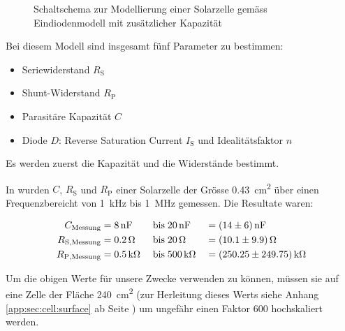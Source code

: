 \clearpage
\begin{figure}[h!tb]
    \centering
    
    \caption{%
        Schaltschema    zur    Modellierung    einer    Solarzelle    gem\"ass
        Eindiodenmodell mit zus\"atzlicher Kapazit\"at%
    }
    \label{fig:circuit:solarCell}
\end{figure}

Bei diesem Modell sind insgesamt f\"unf Parameter zu bestimmen:

\begin{itemize}
    \firmlist
    \item
        Seriewiderstand $R_{\mathrm{S}}$
    \item
        Shunt-Widerstand $R_{\mathrm{P}}$
    \item
        Parasit\"are Kapazit\"at $C$
    \item
        Diode   $D$: Reverse    Saturation   Current    $I_{\mathrm{S}}$   und
        Idealit\"atsfaktor $n$
\end{itemize}

Es werden zuerst die Kapazit\"at und die Widerst\"ande bestimmt.

In \cite{ref:solar:scofield} wurden $C$, $R_{\mathrm{S}}$ und $R_{\mathrm{P}}$
einer  Solarzelle der  Gr\"osse  \SI{0.43}{\centi\meter\squared} \"uber  einen
Frequenzbereicht von \SI{1}{\kilo\hertz} bis \SI{1}{\mega\hertz} gemessen. Die
Resultate waren:

\begin{alignat}{3}
    \label{eq:scofield:C}
    C_{\mathrm{Messung}}    &= \SI{8}{\nano\farad} \; & \text{bis} \; & \SI{20}{\nano\farad} \;  & = & \; \SI{14 \pm 6}{\nano\farad} \\
    \label{eq:scofield:Rs}
    R_{\mathrm{S, Messung}} &= \SI{0.2}{\ohm}      \; & \text{bis} \; & \SI{20}{\ohm}        \;  & = & \; \SI{10.1 \pm 9.9}{\ohm}     \\
    \label{eq:scofield:Rp}
    R_{\mathrm{P, Messung}} &= \SI{0.5}{\kilo\ohm} \; & \text{bis} \; & \SI{500}{\kilo\ohm}  \;  & = & \; \SI{250.25 \pm 249.75}{\kilo\ohm}
\end{alignat}

Um   die   obigen  Werte   f\"ur   unsere   Zwecke  verwenden   zu   k\"onnen,
m\"ussen  sie  auf  eine  Zelle  der  Fl\"ache  \SI{240}{\centi\meter\squared}
(zur  Herleitung  dieses  Werts  siehe  Anhang  \ref{app:sec:cell:surface}  ab
Seite  \pageref{app:sec:cell:surface}) um  ungef\"ahr  einen Faktor  \num{600}
hochskaliert werden.

